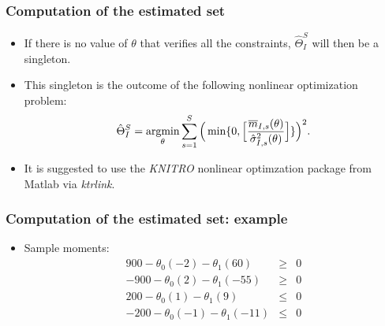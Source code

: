 \documentclass[10pt,letterpaper]{beamer}
\newcommand{\argmin}{\operatornamewithlimits{argmin}}
\begin{document}
\begin{frame}
\frametitle{Computation of the estimated set}

\begin{itemize}
	\item If there is no value of $\theta$ that verifies all the constraints, $\hat{\Theta}^{S}_{I}$ will then be a singleton.
	\item This singleton is the outcome of the following nonlinear optimization problem:
	\begin{equation*}
	\hat{\Theta}^{S}_{I} = \argmin_{\theta}\sum_{s=1}^{S}\Big(\min\{0,\Big[\frac{\overline{m}_{I,s}(\theta)}{\hat{\sigma}^{2}_{I,s}(\theta)}\Big]\}\Big)^{2}.
	\end{equation*}
	\item It is suggested to use the \textit{KNITRO} nonlinear optimzation package from Matlab via \textit{ktrlink}.
\end{itemize}
\end{frame}
\begin{frame}
\frametitle{Computation of the estimated set: example}

\begin{itemize}
	\item Sample moments:
	\begin{eqnarray*}
	900-\theta _{0}(-2)-\theta _{1}(60) &\geq &0 \\
	-900-\theta _{0}(2)-\theta _{1}(-55) &\geq &0 \\
	200-\theta _{0}(1)-\theta _{1}(9) &\leq &0 \\
	-200-\theta _{0}(-1)-\theta _{1}(-11) &\leq &0
	\end{eqnarray*}
\end{itemize}
\end{frame}
\end{document}
